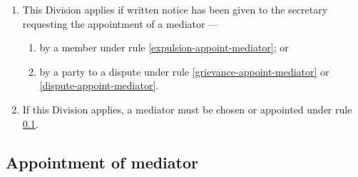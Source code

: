 \documentclass[../constitution.tex]{subfiles}
\begin{document}
\begin{enumerate}

\item This Division applies if written notice has been given to the secretary requesting the appointment of a mediator ---

  \begin{enumerate}
  
  \item by a member under rule \ref{expulsion-appoint-mediator}; or
  \item by a party to a dispute under rule \ref{grievance-appoint-mediator} or \ref{dispute-appoint-mediator}.
  \end{enumerate}
\item If this Division applies, a mediator must be chosen or appointed under rule \ref{appointment-of-mediator}.
\end{enumerate}

\hypertarget{appointment-of-mediator-1}{%
\subsection{Appointment of mediator}\label{appointment-of-mediator}}
\end{document}

